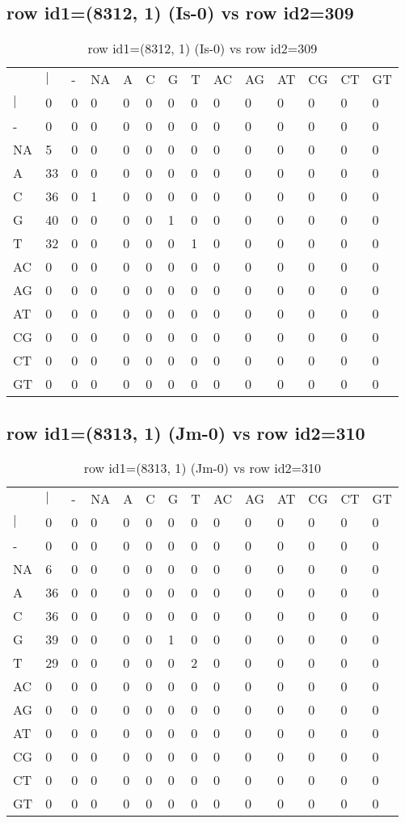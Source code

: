 \subsection{row id1=(8312, 1) (Is-0) vs row id2=309}
\begin{center}
\begin{longtable}{|l|l|l|l|l|l|l|l|l|l|l|l|l|l|}
\caption{row id1=(8312, 1) (Is-0) vs row id2=309} \label{table_dm494}\\
\hline
\\
\hline
&$|$&-&NA&A&C&G&T&AC&AG&AT&CG&CT&GT\\
$|$&0&0&0&0&0&0&0&0&0&0&0&0&0\\
-&0&0&0&0&0&0&0&0&0&0&0&0&0\\
NA&5&0&0&0&0&0&0&0&0&0&0&0&0\\
A&33&0&0&0&0&0&0&0&0&0&0&0&0\\
C&36&0&1&0&0&0&0&0&0&0&0&0&0\\
G&40&0&0&0&0&1&0&0&0&0&0&0&0\\
T&32&0&0&0&0&0&1&0&0&0&0&0&0\\
AC&0&0&0&0&0&0&0&0&0&0&0&0&0\\
AG&0&0&0&0&0&0&0&0&0&0&0&0&0\\
AT&0&0&0&0&0&0&0&0&0&0&0&0&0\\
CG&0&0&0&0&0&0&0&0&0&0&0&0&0\\
CT&0&0&0&0&0&0&0&0&0&0&0&0&0\\
GT&0&0&0&0&0&0&0&0&0&0&0&0&0\\
\hline
\end{longtable}
\end{center}

\subsection{row id1=(8313, 1) (Jm-0) vs row id2=310}
\begin{center}
\begin{longtable}{|l|l|l|l|l|l|l|l|l|l|l|l|l|l|}
\caption{row id1=(8313, 1) (Jm-0) vs row id2=310} \label{table_dm496}\\
\hline
\\
\hline
&$|$&-&NA&A&C&G&T&AC&AG&AT&CG&CT&GT\\
$|$&0&0&0&0&0&0&0&0&0&0&0&0&0\\
-&0&0&0&0&0&0&0&0&0&0&0&0&0\\
NA&6&0&0&0&0&0&0&0&0&0&0&0&0\\
A&36&0&0&0&0&0&0&0&0&0&0&0&0\\
C&36&0&0&0&0&0&0&0&0&0&0&0&0\\
G&39&0&0&0&0&1&0&0&0&0&0&0&0\\
T&29&0&0&0&0&0&2&0&0&0&0&0&0\\
AC&0&0&0&0&0&0&0&0&0&0&0&0&0\\
AG&0&0&0&0&0&0&0&0&0&0&0&0&0\\
AT&0&0&0&0&0&0&0&0&0&0&0&0&0\\
CG&0&0&0&0&0&0&0&0&0&0&0&0&0\\
CT&0&0&0&0&0&0&0&0&0&0&0&0&0\\
GT&0&0&0&0&0&0&0&0&0&0&0&0&0\\
\hline
\end{longtable}
\end{center}

